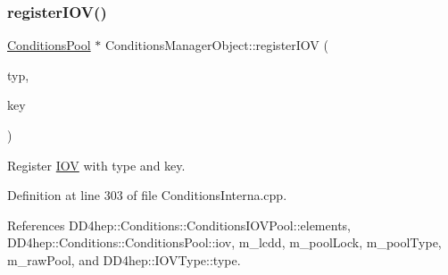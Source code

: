 \hypertarget{class_d_d4hep_1_1_conditions_1_1_conditions_manager_object_ac6647d16096a5fccda601eada638e13b}{}\label{class_d_d4hep_1_1_conditions_1_1_conditions_manager_object_ac6647d16096a5fccda601eada638e13b} 
\subsubsection{\texorpdfstring{register\+I\+O\+V()}{registerIOV()}\hspace{0.1cm}{\footnotesize\ttfamily [2/2]}}
{\footnotesize\ttfamily \hyperlink{class_d_d4hep_1_1_conditions_1_1_conditions_pool}{Conditions\+Pool} $\ast$ Conditions\+Manager\+Object\+::register\+I\+OV (\begin{DoxyParamCaption}\item[{const \hyperlink{class_d_d4hep_1_1_i_o_v_type}{I\+O\+V\+Type} \&}]{typ,  }\item[{\hyperlink{class_d_d4hep_1_1_i_o_v_a07cb46dc875296dc9cccf4ff370104ae}{I\+O\+V\+::\+Key}}]{key }\end{DoxyParamCaption})}



Register \hyperlink{class_d_d4hep_1_1_i_o_v}{I\+OV} with type and key. 



Definition at line 303 of file Conditions\+Interna.\+cpp.



References D\+D4hep\+::\+Conditions\+::\+Conditions\+I\+O\+V\+Pool\+::elements, D\+D4hep\+::\+Conditions\+::\+Conditions\+Pool\+::iov, m\+\_\+lcdd, m\+\_\+pool\+Lock, m\+\_\+pool\+Type, m\+\_\+raw\+Pool, and D\+D4hep\+::\+I\+O\+V\+Type\+::type.

\hypertarget{class_d_d4hep_1_1_conditions_1_1_conditions_manager_object_a4206a6f248b0712fb7e731f99e2c096a}{}\label{class_d_d4hep_1_1_conditions_1_1_conditions_manager_object_a4206a6f248b0712fb7e731f99e2c096a} 
